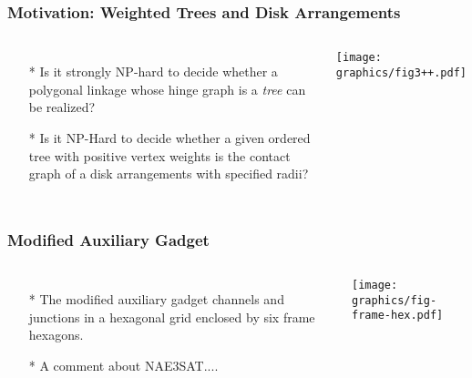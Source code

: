 \documentclass{beamer}
\begin{document}
\begin{frame}\frametitle{Motivation: Weighted Trees and Disk Arrangements}
    \begin{columns}[c]
        \begin{itemize}
            \item[*] Is it strongly NP-hard to decide whether a polygonal linkage whose hinge graph is a \textit{tree} can be realized? 
            \item[*] Is it NP-Hard to decide whether a given ordered tree with positive vertex weights is the contact graph of a disk arrangements with specified radii?
        \end{itemize}
        \begin{minipage}{\linewidth}
            \begin{center}
            \texttt{[image: graphics/fig3++.pdf]}
            \end{center}
        \end{minipage}
    \end{columns}
\end{frame}

\begin{frame} \frametitle{Modified Auxiliary Gadget}
    \begin{columns}[c]
        \begin{itemize}
            \item[*] The modified auxiliary gadget channels and junctions in a hexagonal grid enclosed by six frame hexagons.
            \item[*] A comment about NAE3SAT....
        \end{itemize}
        \begin{minipage}{\linewidth}
            \begin{center}
            \texttt{[image: graphics/fig-frame-hex.pdf]}\label{gfx:fig-frame-hex.pdf}
            \end{center}
        \end{minipage}
    \end{columns}
\end{frame}
\end{document}
